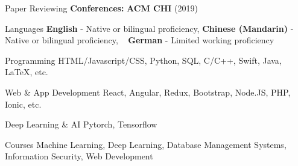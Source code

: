 
\begin{cvskills}
  \cvskill
    {Paper Reviewing} %
    {\textbf{Conferences:} \textbf{ACM CHI} (2019)} 


  
\end{cvskills}








\begin{cvskills}
  \cvskill
    {Languages} %
    {\textbf{English} - Native or bilingual proficiency, \textbf{Chinese (Mandarin)} - Native or bilingual proficiency, } 
  \cvskill
    {~} %
    {\textbf{German} - Limited working proficiency} 
  
  \cvskill
    {Programming} %
    {HTML/Javascript/CSS, Python, SQL, C/C++, Swift, Java, LaTeX, etc. } 

  \cvskill
    {Web \& App Development} %
    {React, Angular, Redux, Bootstrap, Node.JS, PHP, Ionic, etc.} 

  \cvskill
    {Deep Learning \& AI}
    {Pytorch, Tensorflow} 

  \cvskill
    {Courses} %
    {Machine Learning, Deep Learning, Database Management Systems, Information Security, Web Development} 
\end{cvskills}
